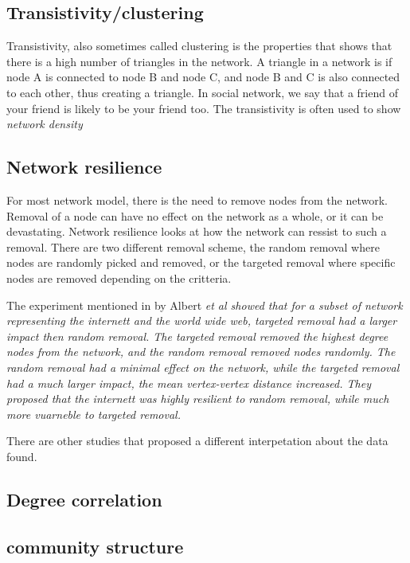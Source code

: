 \subsection{Transistivity/clustering}
Transistivity, also sometimes called clustering is the properties that shows that there is a high number of triangles in the network. A triangle in a network is if node A is connected to node B and node C, and node B and C is also connected to each other, thus creating a triangle. In social network, we say that a friend of your friend is likely to be your friend too\cite{ComplexNetwork2003}. The transistivity is often used to show \it{network density}

\subsection{Network resilience}
For most network model, there is the need to remove nodes from the network. Removal of a node can have no effect on the network as a whole, or it can be devastating. Network resilience looks at how the network can ressist to such a removal. There are two different removal scheme, the random removal where nodes are randomly picked and removed, or the targeted removal where specific nodes are removed depending on the critteria. 

The experiment mentioned in \cite{complexNetwork} by Albert \it{et al} showed that for a subset of network representing the internett and the world wide web, targeted removal had a larger impact then random removal. The targeted removal removed the highest degree nodes from the network, and the random removal removed nodes randomly. The random removal had a minimal effect on the network, while the targeted removal had a much larger impact, the mean vertex-vertex distance increased. They proposed that the internett was highly resilient to random removal, while much more vuarneble to targeted removal. 

There are other studies that proposed a different interpetation about the data found.	

\subsection{Degree correlation}



\subsection{community structure}



